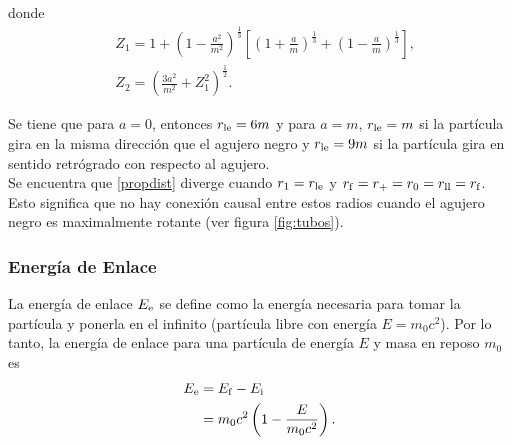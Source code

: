donde
\begin{eqnarray}
&Z_1=1+\left( 1-\frac{a^2}{m^2}\right)^{\frac{1}{3}}\left[\left( 1+\frac{a}{m}\right)^{\frac{1}{3}}+\left( 1-\frac{a}{m}\right)^{\frac{1}{3}} \right] ,\\
&Z_2 =\left(\frac{3a^2}{m^2}+Z_1^2 \right)^{\frac{1}{2}}.
\end{eqnarray}

Se tiene que para $a=0$, entonces $r_{\rm le}=6m$ y para $a=m$, $r_{\rm le}=m$ si la part\'icula gira en la misma direcci\'on que el agujero negro y $r_{\rm le}=9m$ si la part\'icula gira en sentido retr\'ogrado con respecto al agujero.\\

%


Se encuentra que \eqref{propdist} diverge cuando $r_1=r_{\rm le}$ y $r_{\rm f}=r_{\rm +}=r_{0}=r_{\rm ll}=r_{\rm f}$. Esto significa que no hay conexi\'on causal entre estos radios cuando el agujero negro es maximalmente rotante (ver figura \ref{fig:tubos}).

\subsubsection{Energ\'ia de Enlace}

La energ\'ia de enlace $E_{\rm e}$ se define como la energ\'ia necesaria para tomar la part\'icula y ponerla en el infinito (part\'icula libre con energ\'ia $E=m_0c^2$). Por lo tanto, la energ\'ia de enlace para una part\'icula de energ\'ia $E$ y masa en reposo $m_0$ es
 \begin{equation}
 \begin{aligned}
 E_{\rm e}&=E_{\rm f}-E_{\rm i}\\
 &=m_0c^2\left(1-\frac{E}{m_0c^2}\right).
 \end{aligned}
 \end{equation}
 

